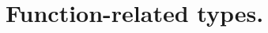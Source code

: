 \hypertarget{group___function___t_y_p_e_s}{}\section{Function-\/related types.}
\label{group___function___t_y_p_e_s}
